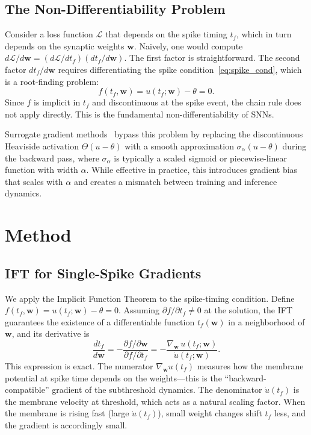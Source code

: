 \documentclass[10pt,twocolumn]{article}
\begin{document}
\subsection{The Non-Differentiability Problem}

Consider a loss function $\mathcal{L}$ that depends on the spike timing $t_f$, which in turn depends on the synaptic weights $\mathbf{w}$. Naively, one would compute $d\mathcal{L}/d\mathbf{w} = (d\mathcal{L}/dt_f)(dt_f/d\mathbf{w})$. The first factor is straightforward. The second factor $dt_f/d\mathbf{w}$ requires differentiating the spike condition~\eqref{eq:spike_cond}, which is a root-finding problem:
\begin{equation}
    f(t_f, \mathbf{w}) = u(t_f; \mathbf{w}) - \theta = 0.
\end{equation}
Since $f$ is implicit in $t_f$ and discontinuous at the spike event, the chain rule does not apply directly. This is the fundamental non-differentiability of SNNs.

Surrogate gradient methods~\citep{neftci2019surrogate} bypass this problem by replacing the discontinuous Heaviside activation $\Theta(u - \theta)$ with a smooth approximation $\sigma_\alpha(u - \theta)$ during the backward pass, where $\sigma_\alpha$ is typically a scaled sigmoid or piecewise-linear function with width $\alpha$. While effective in practice, this introduces gradient bias that scales with $\alpha$ and creates a mismatch between training and inference dynamics.

\section{Method}

\subsection{IFT for Single-Spike Gradients}

We apply the Implicit Function Theorem to the spike-timing condition. Define $f(t_f, \mathbf{w}) = u(t_f; \mathbf{w}) - \theta = 0$. Assuming $\partial f / \partial t_f \neq 0$ at the solution, the IFT guarantees the existence of a differentiable function $t_f(\mathbf{w})$ in a neighborhood of $\mathbf{w}$, and its derivative is
\begin{equation}
    \frac{dt_f}{d\mathbf{w}} = -\frac{\partial f / \partial \mathbf{w}}{\partial f / \partial t_f} = -\frac{\nabla_\mathbf{w} \, u(t_f; \mathbf{w})}{\dot{u}(t_f; \mathbf{w})}.
    \label{eq:ift_main}
\end{equation}
This expression is exact. The numerator $\nabla_\mathbf{w} u(t_f)$ measures how the membrane potential at spike time depends on the weights---this is the ``backward-compatible'' gradient of the subthreshold dynamics. The denominator $\dot{u}(t_f)$ is the membrane velocity at threshold, which acts as a natural scaling factor. When the membrane is rising fast (large $\dot{u}(t_f)$), small weight changes shift $t_f$ less, and the gradient is accordingly small.
\end{document}
